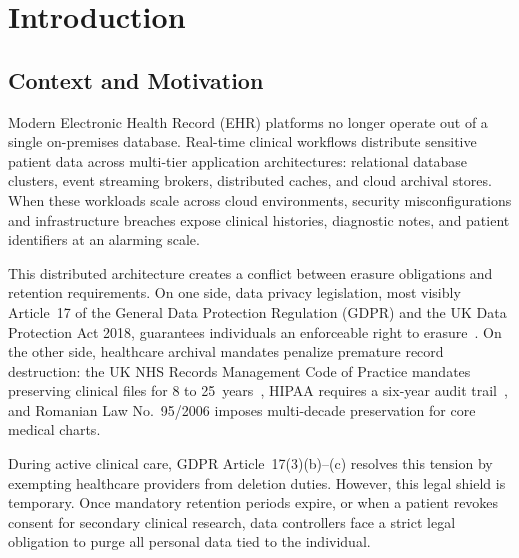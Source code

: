 
\chapter{Introduction}\label{section:introduction}


\section{Context and Motivation}\label{section:context}

Modern Electronic Health Record (EHR) platforms no longer operate out of a single on-premises database. Real-time clinical workflows distribute sensitive patient data across multi-tier application architectures: relational database clusters, event streaming brokers, distributed caches, and cloud archival stores. When these workloads scale across cloud environments, security misconfigurations and infrastructure breaches expose clinical histories, diagnostic notes, and patient identifiers at an alarming scale.

This distributed architecture creates a conflict between erasure obligations and retention requirements. On one side, data privacy legislation, most visibly Article~17 of the General Data Protection Regulation (GDPR) and the UK Data Protection Act 2018, guarantees individuals an enforceable right to erasure~\cite{gdpr2016, dpa2018}. On the other side, healthcare archival mandates penalize premature record destruction: the UK NHS Records Management Code of Practice mandates preserving clinical files for 8 to 25~years~\cite{nhs_records_2021}, HIPAA requires a six-year audit trail~\cite{hipaa2003}, and Romanian Law No.~95/2006 imposes multi-decade preservation for core medical charts.

During active clinical care, GDPR Article~17(3)(b)--(c) resolves this tension by exempting healthcare providers from deletion duties. However, this legal shield is temporary. Once mandatory retention periods expire, or when a patient revokes consent for secondary clinical research, data controllers face a strict legal obligation to purge all personal data tied to the individual.

